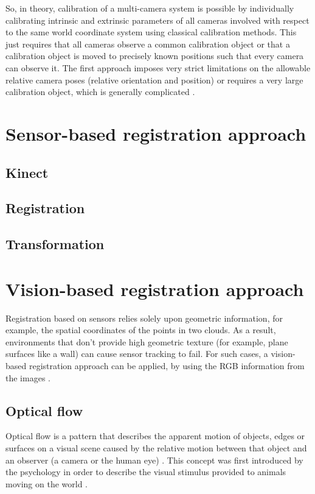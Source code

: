 \documentclass[msc, a4paper, classic, en]{ufbathesis}
\begin{document}
So, in theory, calibration of a multi-camera system is possible by individually calibrating intrinsic and extrinsic parameters of all cameras involved with respect to the same world coordinate system using classical calibration methods. This just requires that all cameras observe a common calibration object or that a calibration object is moved to precisely known positions such that every camera can observe it. The first approach imposes very strict limitations on the allowable relative camera poses (relative orientation and position) or requires a very large calibration object, which is generally complicated \cite{Chen00widearea}.

\section{Sensor-based registration approach}

\subsection{Kinect}

\subsection{Registration}

\subsection{Transformation}

\section{Vision-based registration approach}

Registration based on sensors relies solely upon geometric information, for example, the spatial coordinates of the points in two clouds. As a result, environments that don't provide high geometric texture (for example, plane surfaces like a wall) can cause sensor tracking to fail. For such cases, a vision-based registration approach can be applied, by using the RGB information from the images \cite{kinectkanade}. 
\subsection{Optical flow}

Optical flow is a pattern that describes the apparent motion of objects, edges or surfaces on a visual scene caused by the relative motion between that object and an observer (a camera or the human eye) \cite{burton1978thinking}. This concept was first introduced by the psychology in order to describe the visual stimulus provided to animals moving on the world \cite{gibson1950perception}.
\end{document}
